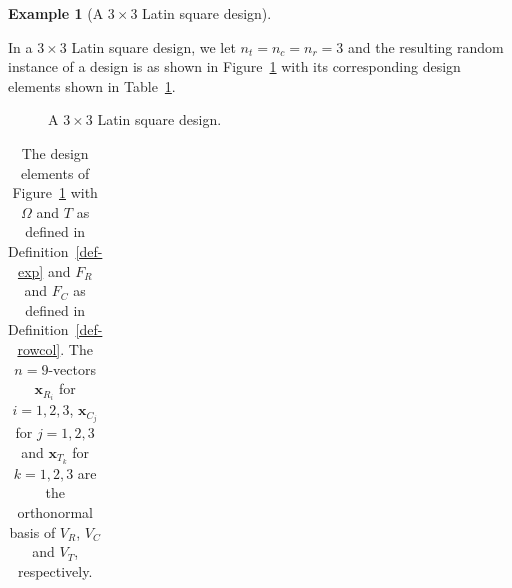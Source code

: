 \documentclass[
  a4paper,
  oneside,
  openany,
  12pt,
  onecolumn]{book}
\theoremstyle{definition}
\theoremstyle{definition}
\newtheorem{example}{Example}[chapter]
\theoremstyle{plain}
\theoremstyle{remark}
\begin{document}
\begin{example}[A \(3 \times 3\) Latin square
design]\protect\hypertarget{exm-lsd}{}\label{exm-lsd}

In a \(3 \times 3\) Latin square design, we let \(n_t = n_c = n_r = 3\)
and the resulting random instance of a design is as shown in
Figure~\ref{fig-lsd} with its corresponding design elements shown in
Table~\ref{tbl-lsd}.

\begin{figure}


\caption{\label{fig-lsd}A \(3 \times 3\) Latin square design.}

\end{figure}%

\begin{longtable}[]{@{}
  >{\raggedleft\arraybackslash}p{}
  >{\raggedright\arraybackslash}p{}
  >{\raggedright\arraybackslash}p{}
  >{\raggedright\arraybackslash}p{}
  >{\raggedleft\arraybackslash}p{}
  >{\raggedleft\arraybackslash}p{}
  >{\raggedleft\arraybackslash}p{}
  >{\raggedleft\arraybackslash}p{}
  >{\raggedleft\arraybackslash}p{}
  >{\raggedleft\arraybackslash}p{}
  >{\raggedleft\arraybackslash}p{}
  >{\raggedleft\arraybackslash}p{}
  >{\raggedleft\arraybackslash}p{}@{}}

\caption{\label{tbl-lsd}The design elements of Figure~\ref{fig-lsd} with
\(\Omega\) and \(T\) as defined in Definition~\ref{def-exp} and \(F_R\)
and \(F_C\) as defined in Definition~\ref{def-rowcol}. The
\(n=9\)-vectors \(\boldsymbol{x}_{R_i}\) for \(i = 1, 2, 3\),
\(\boldsymbol{x}_{C_j}\) for \(j = 1, 2, 3\) and
\(\boldsymbol{x}_{T_k}\) for \(k = 1, 2, 3\) are the orthonormal basis
of \(V_R\), \(V_C\) and \(V_T\), respectively.}

\tabularnewline


\end{longtable}
\end{example}
\end{document}
